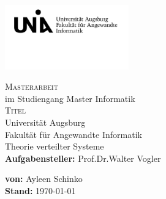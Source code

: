 \begin{titlepage}
\includegraphics[width=0.4\textwidth]{Uni_Aug_Logo_FAI_schwarz.png}
\vspace{-1cm}
\begin{center}
  \LARGE \textsc{Masterarbeit}\\
  \normalsize im Studiengang Master Informatik\\
  \vfill
  \Huge \textsc{Titel}\\
  \vfill
  \Large Universität Augsburg\\
  Fakultät für Angewandte Informatik\\
  Theorie verteilter Systeme\\
  \vspace{2cm}
  \rmfamily \large \textbf{Aufgabensteller:} Prof.\;Dr.\;Walter Vogler
\end{center}
\vspace{1.5cm}
\large \textbf{%
  von:}
Ayleen Schinko\\
\textbf{%
  Stand:}
\today\\
\end{titlepage}
